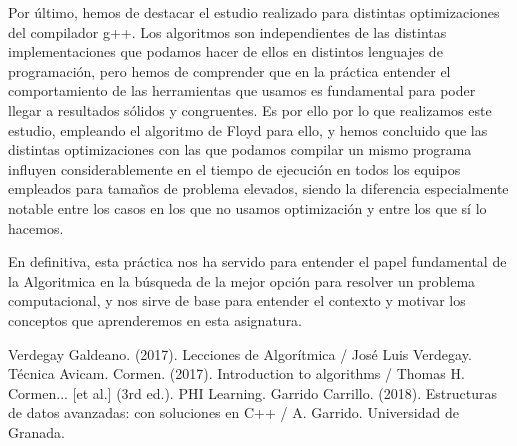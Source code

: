 \documentclass{homework}
\begin{document}
    Por último, hemos de destacar el estudio realizado para distintas optimizaciones del compilador g++. Los algoritmos son independientes de las distintas
    implementaciones que podamos hacer de ellos en distintos lenguajes de programación, pero hemos de comprender que en la práctica entender el comportamiento
    de las herramientas que usamos es fundamental para poder llegar a resultados sólidos y congruentes. Es por ello por lo que realizamos este estudio, empleando 
    el algoritmo de Floyd para ello, y hemos concluido que las distintas optimizaciones con las que podamos compilar un mismo programa influyen considerablemente en el tiempo de ejecución en todos los 
    equipos empleados para tamaños de problema elevados, siendo la diferencia especialmente notable entre los casos en los que no usamos optimización y entre los que sí lo hacemos.
    
    En definitiva, esta práctica nos ha servido para entender el papel fundamental de la Algoritmica en la búsqueda de la mejor opción para resolver un problema
    computacional, y nos sirve de base para entender el contexto y motivar los conceptos que aprenderemos en esta asignatura.

    \newpage
    \begin{thebibliography}{0}
         Verdegay Galdeano. (2017). Lecciones de Algorítmica / José Luis Verdegay. Técnica Avicam.
         Cormen. (2017). Introduction to algorithms / Thomas H. Cormen... [et al.] (3rd ed.). PHI Learning.
         Garrido Carrillo. (2018). Estructuras de datos avanzadas: con soluciones en C++ / A. Garrido. Universidad de Granada.        
    \end{thebibliography}
    
\end{document}
